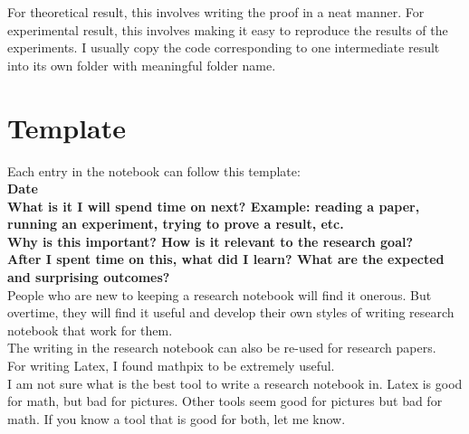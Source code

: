 \documentclass[11pt]{article}
\begin{document}
For theoretical result, this involves writing the proof in a neat manner. For experimental result, this involves making it easy to reproduce the results of the experiments. I usually copy the code corresponding to one intermediate result into its own folder with meaningful folder name.

\section{Template}

Each entry in the notebook can follow this template:
\\

\textbf{Date}
\\

\textbf{What is it I will spend time on next? Example: reading a paper, running an experiment, trying to prove a result, etc.}
\\

\textbf{Why is this important? How is it relevant to the research goal?}
\\

\textbf{After I spent time on this, what did I learn? What are the expected and surprising outcomes?}
\\

People who are new to keeping a research notebook will find it onerous. But overtime, they will find it useful and develop their own styles of writing research notebook that work for them.
\\

The writing in the research notebook can also be re-used for research papers.
\\

For writing Latex, I found mathpix to be extremely useful.
\\

I am not sure what is the best tool to write a research notebook in. Latex is good for math, but bad for pictures. Other tools seem good for pictures but bad for math. If you know a tool that is good for both, let me know.
\end{document}
